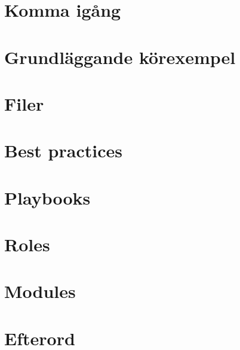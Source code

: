 \pagestyle{plain}

\setcounter{page}{1}
\chapter{Komma igång}\label{sec:intro}


\chapter{Grundläggande körexempel}\label{sec:basicexamples}


\chapter{Filer}\label{sec:files}


\chapter{Best practices}\label{sec:bestpractices}


\chapter{Playbooks}\label{sec:playbooks}


\chapter{Roles}\label{sec:roles}


\chapter{Modules}\label{sec:modules}


\chapter{Efterord}\label{sec:outro}

